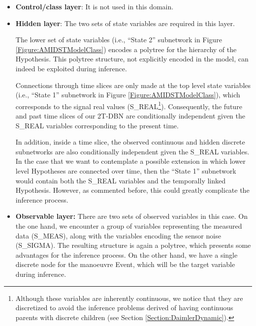 \begin{itemize}

\item \textbf{Control/class layer}: It is not used in this domain.

\item \textbf{Hidden layer}: The two sets of state variables are required in this layer. 

The lower set of state variables (i.e., ``State 2'' subnetwork in Figure \ref{Figure:AMIDSTModelClass}) encodes a polytree \cite{JensenNielsen2007} for the hierarchy of the Hypothesis. This polytree structure, not explicitly encoded in the model, can indeed be exploited during inference.

Connections through time slices are only made at the top level state variables (i.e., ``State 1'' subnetwork in Figure
\ref{Figure:AMIDSTModelClass}), which corresponds to the signal real values (S\_REAL\footnote{Although these variables
  are inherently continuous, we notice that they are discretized to avoid the inference problems derived of having
  continuous parents with discrete children (see Section \ref{Section:DaimlerDynamic}).}). Consequently, the future and
past time slices of our 2T-DBN are conditionally independent given the S\_REAL variables corresponding to the present time. 

In addition, inside a time slice, the observed continuous and hidden discrete subnetworks are also conditionally
independent given the S\_REAL variables. In the case that we want to contemplate a possible extension in which lower
level Hypotheses are connected over time, then the ``State 1'' subnetwork would contain both the S\_REAL variables and the temporally linked Hypothesis. However, as commented before, this could greatly complicate the inference process. 

\item \textbf{Observable layer:} There are two sets of observed variables in this case. On the one hand, we encounter a group of variables representing the measured data (S\_MEAS), along with the variables encoding the sensor noise (S\_SIGMA). The resulting structure is again a polytree, which presents some advantages for the inference process. On the other hand, we have a single discrete node for the manoeuvre Event, which will be the target variable during inference. 

\end{itemize}

